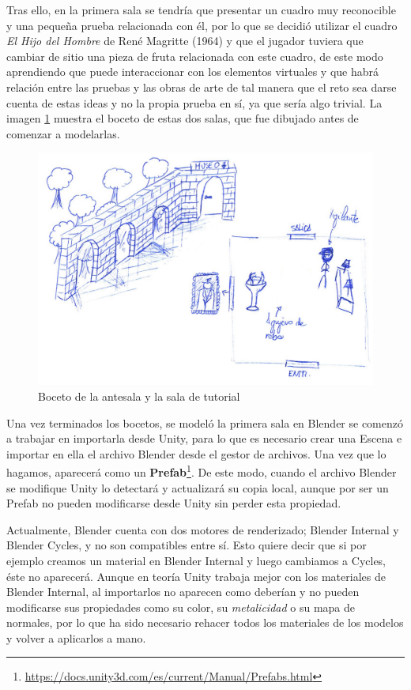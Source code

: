 Tras ello, en la primera sala se tendría que presentar un cuadro muy reconocible y una pequeña prueba relacionada con él, por lo que se decidió utilizar el cuadro \textit{El Hijo del Hombre} de René Magritte (1964) y que el jugador tuviera que cambiar de sitio una pieza de fruta relacionada con este cuadro, de este modo aprendiendo que puede interaccionar con los elementos virtuales y que habrá relación entre las pruebas y las obras de arte de tal manera que el reto sea darse cuenta de estas ideas y no la propia prueba en sí, ya que sería algo trivial. La imagen \ref{fig:bocetos-salas-0-1} muestra el boceto de estas dos salas, que fue dibujado antes de comenzar a modelarlas.

\begin{figure}[!h]
\begin{center}
\includegraphics[width=.8\textwidth]{imagenes/7/bocetos/boceto-sala-0-1.png}
\caption{Boceto de la antesala y la sala de tutorial}
\label{fig:bocetos-salas-0-1}
\end{center}
\end{figure}

Una vez terminados los bocetos, se modeló la primera sala en Blender se comenzó a trabajar en importarla desde Unity, para lo que es necesario crear una Escena e importar en ella el archivo Blender desde el gestor de archivos. Una vez que lo hagamos, aparecerá como un \textbf{Prefab}\footnote{\url{https://docs.unity3d.com/es/current/Manual/Prefabs.html}}. De este modo, cuando el archivo Blender se modifique Unity lo detectará y actualizará su copia local, aunque por ser un Prefab no pueden modificarse desde Unity sin perder esta propiedad.

Actualmente, Blender cuenta con dos motores de renderizado; Blender Internal y Blender Cycles, y no son compatibles entre sí. Esto quiere decir que si por ejemplo creamos un material en Blender Internal y luego cambiamos a Cycles, éste no aparecerá. Aunque en teoría Unity trabaja mejor con los materiales de Blender Internal, al importarlos no aparecen como deberían y no pueden modificarse sus propiedades como su color, su \textit{metalicidad} o su mapa de normales, por lo que ha sido necesario rehacer todos los materiales de los modelos y volver a aplicarlos a mano.


